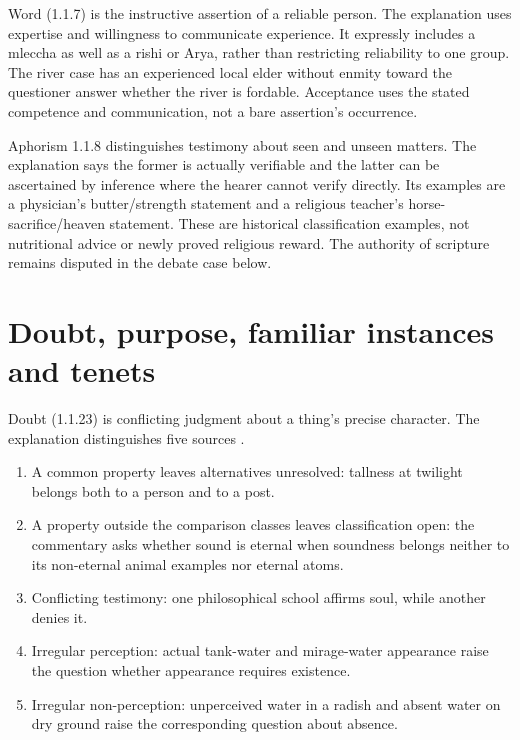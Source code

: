 Word (1.1.7) is the instructive assertion of a reliable person. The explanation
uses expertise and willingness to communicate experience. It expressly includes
a mleccha as well as a rishi or Arya, rather than restricting reliability to
one group. The river case has an experienced local elder without enmity toward
the questioner answer whether the river is fordable. Acceptance uses the stated
competence and communication, not a bare assertion's occurrence.

Aphorism 1.1.8 distinguishes testimony about seen and unseen matters. The
explanation says the former is actually verifiable and the latter can be
ascertained by inference where the hearer cannot verify directly.
Its examples are a physician's butter/strength statement and a religious
teacher's horse-sacrifice/heaven statement. These are historical classification
examples, not nutritional advice or newly proved religious reward.
The authority of scripture remains disputed in the debate case below.

\section{Doubt, purpose, familiar instances and tenets}
\label{sec:p13-nyaya-inquiry-conditions}

Doubt (1.1.23) is conflicting judgment about a thing's precise character.
The explanation distinguishes five sources
\cite[1.1.23--31, pp.~7--10]{GotamaVidyabhusana1913NyayaSutras}.

\begin{enumerate}
 \item A common property leaves alternatives unresolved: tallness at
 twilight belongs both to a person and to a post.
 \item A property outside the comparison classes leaves classification
 open: the commentary asks whether sound is eternal when soundness
 belongs neither to its non-eternal animal examples nor eternal atoms.
 \item Conflicting testimony: one philosophical school affirms soul,
 while another denies it.
 \item Irregular perception: actual tank-water and mirage-water appearance
 raise the question whether appearance requires existence.
 \item Irregular non-perception: unperceived water in a radish and absent
 water on dry ground raise the corresponding question about absence.
\end{enumerate}

